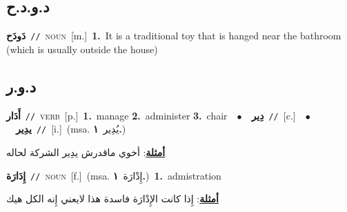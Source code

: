 \documentclass[10pt,a4paper,twoside]{article} %
\begin{document}
\begin{multicols}{2}
\vspace{-3mm}
\subsection*{\color{blue}\foreignlanguage{arabic}{د.و.د.ح}\color{blue}{}} 

{\setlength\topsep{0pt}\textbf{\foreignlanguage{arabic}{دَودَح}}\ {\color{gray}\texttt{//}\color{black}}\ \textsc{noun}\ [m.]\ \textbf{1.}~It is a traditional toy that is hanged near the bathroom (which is usually outside the house)\ } \vspace{2mm}

\vspace{-3mm}
\subsection*{\color{blue}\foreignlanguage{arabic}{د.و.ر}\color{blue}{}} 

{\setlength\topsep{0pt}\textbf{\foreignlanguage{arabic}{أَدَار}}\ {\color{gray}\texttt{//}\color{black}}\ \textsc{verb}\ [p.]\ \textbf{1.}~manage  \textbf{2.}~administer  \textbf{3.}~chair\ \ $\bullet$\ \ \setlength\topsep{0pt}\textbf{\foreignlanguage{arabic}{دِير}}\ {\color{gray}\texttt{//}\color{black}}\ [c.]\ \ $\bullet$\ \ \setlength\topsep{0pt}\textbf{\foreignlanguage{arabic}{يدِير}}\ {\color{gray}\texttt{//}\color{black}}\ [i.]\ \color{gray}(msa. \foreignlanguage{arabic}{يُدِير}~\foreignlanguage{arabic}{\textbf{١.}})\color{black}\  \begin{flushright}\color{gray}\foreignlanguage{arabic}{\textbf{\underline{\foreignlanguage{arabic}{أمثلة}}}: أخوي ماقدرش يدِير الشركة لحاله}\end{flushright}\color{black}} \vspace{2mm}

{\setlength\topsep{0pt}\textbf{\foreignlanguage{arabic}{إِدَارَة}}\ {\color{gray}\texttt{//}\color{black}}\ \textsc{noun}\ [f.]\ \color{gray}(msa. \foreignlanguage{arabic}{إِدْارَة}~\foreignlanguage{arabic}{\textbf{١.}})\color{black}\ \textbf{1.}~admistration\  \begin{flushright}\color{gray}\foreignlanguage{arabic}{\textbf{\underline{\foreignlanguage{arabic}{أمثلة}}}: إِذا كانت الإِدْارَة فاسدة هذا لايعني إِنه الكل هيك}\end{flushright}\color{black}} \vspace{2mm}


\end{multicols}
\end{document}
